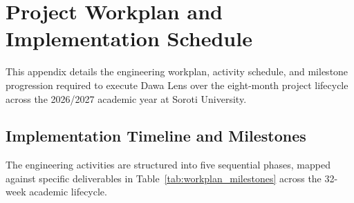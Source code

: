 \chapter{Project Workplan and Implementation Schedule}
\label{app:workplan}

This appendix details the engineering workplan, activity schedule, and milestone progression required to execute Dawa Lens over the eight-month project lifecycle across the 2026/2027 academic year at Soroti University.

\section{Implementation Timeline and Milestones}

The engineering activities are structured into five sequential phases, mapped against specific deliverables in Table~\ref{tab:workplan_milestones} across the 32-week academic lifecycle.

